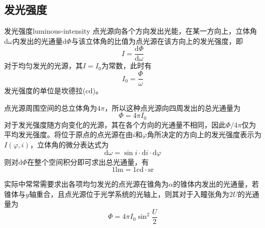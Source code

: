 \documentclass[cn,10pt,chinesefont=founder,math=mtpro2,cite=super,toc=onecol,twoside,openany]{elegantbook}
\begin{document}
\subsection{发光强度}
\begin{definition}{发光强度}{luminous-intensity}
点光源向各个方向发出光能，在某一方向上，立体角$\mathrm{d}\omega$内发出的光通量$\mathrm{d}\varPhi$与该立体角的比值为点光源在该方向上的发光强度，即
\begin{equation}
I=\frac{\mathrm{d}\varPhi}{\mathrm{d}\omega}
\end{equation}
对于均匀发光的光源，其$I=I_0$为常数，此时有
\begin{equation}
I_0=\frac{\varPhi}{\omega}
\end{equation}
发光强度的单位是坎德拉($\mathrm{cd}$)。
\end{definition}
点光源周围空间的总立体角为$4\pi$，所以这种点光源向四周发出的总光通量为
\begin{equation}
\varPhi=4\pi I_0
\end{equation}
对于发光强度随方向变化的光源，其在各个方向的光通量不相同，因此$\varPhi/4\pi$仅为平均发光强度。将位于原点的点光源在由$i$和$\varphi$角所决定的方向上的发光强度表示为$I(\varphi,i)$，立体角的微分表达式为
\begin{equation}
\mathrm{d}\omega=\sin i\cdot\mathrm{d}i\cdot\mathrm{d}\varphi
\end{equation}
则对$\mathrm{d}\varPhi$在整个空间积分即可求出总光通量，有
\begin{equation}
1\mathrm{lm}=1\mathrm{cd}\cdot\mathrm{sr}
\end{equation}
\begin{note}
	实际中常常需要求出各项均匀发光的点光源在锥角为$\alpha$的锥体内发出的光通量，若锥体与$y$轴重合，且点光源位于光学系统的光轴上，则其对于入瞳张角为$2U$的光通量为
	\begin{equation}
	\varPhi=4\pi I_0\sin^2\frac{U}{2}
	\end{equation}
\end{note}
\end{document}
